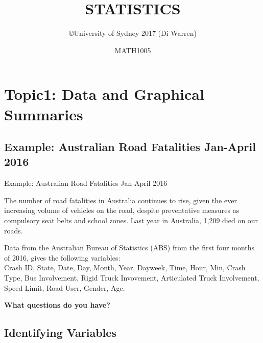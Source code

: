 \documentclass[t,xcolor=pdftex,dvipsnames,table]{beamer}
\title{\Huge STATISTICS}
\subtitle{}
\author{\copyright University of Sydney 2017 (Di Warren)}
\date{MATH1005}
\begin{document}
\section[1]{Topic1: Data and Graphical Summaries}

\subsection[]{Example: Australian Road Fatalities Jan-April 2016}
\begin{frame}{Example: Australian Road Fatalities Jan-April 2016}

The number of road fatalities in Australia continues to rise, given the ever increasing volume of vehicles on the road, despite preventative measures as compulsory seat belts and school zones. Last year in Australia, 1,209 died on our roads.

\vspace{.5cm}
Data from the Australian Bureau of Statistics (ABS) from the first four months of 2016, gives the following variables: \\

Crash ID, State, Date, Day, Month, Year, Dayweek, Time, Hour, Min, Crash Type, Bus Involvement, Rigid Truck Invovement, Articulated Truck Involvement, Speed Limit, Road User, Gender, Age.
\href{http://www.maths.usyd.edu.au/u/UG/JM/StatsData.html}{} 

\vspace{.5cm}
{\bf What questions do you have?}
\end{frame}

\subsection[]{Identifying Variables}
\end{document}
